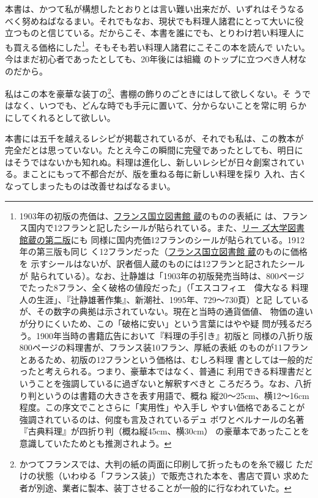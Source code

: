 本書は、かつて私が構想したとおりとは言い難い出来だが、いずれはそうなる
べく努めねばなるまい。それでもなお、現状でも料理人諸君にとって大いに役
立つものと信じている。だからこそ、本書を誰にでも、とりわけ若い料理人に
も買える価格にした\footnote{1903年の初版の売価は、\href{http://gallica.bnf.fr/ark:/12148/bpt6k65768837}{フランス国立図書館
  蔵}のものの表紙に
  は、フランス国内で12フランと記したシールが貼られている。また、\href{https://archive.org/details/b21525912}{リー
  ズ大学図書館蔵の第二版}にも
  同様に国内売価12フランのシールが貼られている。1912年の第三版も同じ
  く12フランだった（\href{http://gallica.bnf.fr/ark:/12148/bpt6k96923116}{フランス国立図書館
  蔵}のものに価格を
  示すシールはないが、訳者個人蔵のものには12フランと記されたシールが
  貼られている）。なお、辻静雄は「1903年の初版発売当時は、800ページ
  でたった8フラン、全く破格の値段だった」（「エスコフィエ　偉大なる
  料理人の生涯」、『辻静雄著作集』、新潮社、1995年、729〜730頁）と記
  しているが、その数字の典拠は示されていない。現在と当時の通貨価値、
  物価の違いが分りにくいため、この「破格に安い」という言葉にはやや疑
  問が残るだろう。1900年当時の書籍広告において『料理の手引き』初版と
  同様の八折り版800ページの料理書が、フランス装10フラン、厚紙の表紙
  のものが11フランとあるため、初版の12フランという価格は、むしろ料理
  書としては一般的だったと考えられる。つまり、豪華本ではなく、普通に
  利用できる料理書だということを強調しているに過ぎないと解釈すべきと
  ころだろう。なお、八折り判というのは書籍の大きさを表す用語で、概ね
  縦20〜25cm、横12〜16cm程度。この序文でことさらに「実用性」や入手し
  やすい価格であることが強調されているのは、何度も言及されているデュ
  ボワとベルナールの名著『古典料理』が四折り判（概ね縦45cm、横30cm）
  の豪華本であったことを意識していたためとも推測されよう。}。そもそも若い料理人諸君にこそこの本を読んで
いたい。今はまだ初心者であったとしても、20年後には組織
のトップに立つべき人材なのだから。

私はこの本を豪華な装丁の\footnote{かつてフランスでは、大判の紙の両面に印刷して折ったものを糸で綴じ
  ただけの状態（いわゆる「フランス装」）で販売された本を、書店で買い
  求めた者が別途、業者に製本、装丁させることが一般的に行なわれていた。}、書棚の飾りのごときにはして欲しくない。そ
うではなく、いつでも、どんな時でも手元に置いて、分からないことを常に明
らかにしてくれるとして欲しい。

本書には五千を越えるレシピが掲載されているが、それでも私は、この教本が
完全だとは思っていない。たとえ今この瞬間に完璧であったとしても、明日に
はそうではないかも知れぬ。料理は進化し、新しいレシピが日々創案されてい
る。まことにもって不都合だが、版を重ねる毎に新しい料理を採り
入れ、古くなってしまったものは改善せねばなるまい。

